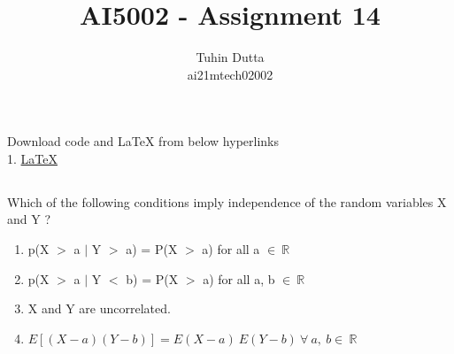 \documentclass[journal,12pt,twocolumn]{IEEEtran}
\begin{document}
\providecommand{\mtx}[1]{\mathbf{#1}}
\providecommand{\fourier}{\overset{\mathcal{F}}{ \rightleftharpoons}}
\providecommand{\system}{\overset{\mathcal{H}}{ \longleftrightarrow}}
\newcommand{\solution}{\noindent \textbf{Solution: }}
\newcommand{\cosec}{\,\text{cosec}\,}
\providecommand{\dec}[2]{\ensuremath{\overset{#1}{\underset{#2}{\gtrless}}}}
\newcommand{\myvec}[1]{\ensuremath{\begin{pmatrix}#1\end{pmatrix}}}
\newcommand{\mydet}[1]{\ensuremath{\begin{vmatrix}#1\end{vmatrix}}}
\makeatletter
{}
\makeatother
\let\StandardTheFigure\thefigure
\let\vec\mathbf
\renewcommand{\thefigure}{\theproblem}
\def\putbox#1#2#3{\makebox[0in][l]{\makebox[#1][l]{}\raisebox{\baselineskip}[0in][0in]{\raisebox{#2}[0in][0in]{#3}}}}
     \def\rightbox#1{\makebox[0in][r]{#1}}
     \def\centbox#1{\makebox[0in]{#1}}
     \def\topbox#1{\raisebox{-\baselineskip}[0in][0in]{#1}}
     \def\midbox#1{\raisebox{-0.5\baselineskip}[0in][0in]{#1}}
\vspace{3cm}
\title{AI5002 - Assignment 14}
\author{Tuhin Dutta\\ ai21mtech02002}
\maketitle
\newpage
\bigskip
\renewcommand{\thefigure}{\theenumi}
\renewcommand{\thetable}{\theenumi}
\begin{mdframed}
Download code and LaTeX from below hyperlinks\\
1. \href{https://github.com/Tauhait/AI5002/tree/main/Assignment-14/LaTeX}{LaTeX}
\end{mdframed}
\subsection*{}
Which of the following conditions imply independence of the random variables X
and Y ?\\
\begin{enumerate}
    \item {} p(X $\mathop{>}$ a $|$ Y $\mathop{>}$ a) = P(X $\mathop{>}$ a) for all a $\in\ \mathbb{R}$\\ 
    \item {} p(X $\mathop{>}$ a $|$ Y $\mathop{<}$ b) = P(X $\mathop{>}$ a) for all a, b $\in\ \mathbb{R}$\\
    \item {} X and Y are uncorrelated.\\
    \item {} $E[(X-a)(Y-b)] = E(X-a)\ E(Y-b)\ \forall\ a,\ b \in\ \mathbb{R}$\\
\end{enumerate}
\end{document}
